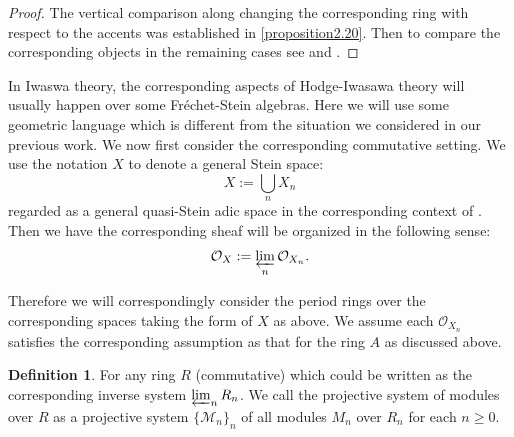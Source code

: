 \documentclass[12pt]{amsart}
\theoremstyle{definition}
\newtheorem{definition}[theorem]{Definition}
\numberwithin{equation}{section}
\begin{document}
\begin{proof}
The vertical comparison along changing the corresponding ring with respect to the accents was established in \cref{proposition2.20}. Then to compare the corresponding objects in the remaining cases see \cite[Theorem 5.7.4]{KL16} and \cite[Proposition 5.44]{XT2}.	
\end{proof}












\indent In Iwaswa theory, the corresponding aspects of Hodge-Iwasawa theory will usually happen over some Fr\'echet-Stein algebras. Here we will use some geometric language which is different from the situation we considered in our previous work. We now first consider the corresponding commutative setting. We use the notation $X$ to denote a general Stein space:
\begin{displaymath}
X:= \bigcup_{n} X_n	
\end{displaymath}
regarded as a general quasi-Stein adic space in the corresponding context of \cite[Chapter 2.6]{KL16}. Then we have the corresponding sheaf will be organized in the following sense:
\begin{align}
\mathcal{O}_X:=\varprojlim_{n} \mathcal{O}_{X_n}.	
\end{align}

Therefore we will correspondingly consider the period rings over the corresponding spaces taking the form of $X$ as above. We assume each $\mathcal{O}_{X_n}$ satisfies the corresponding assumption as that for the ring $A$ as discussed above. 

\begin{definition}
For any ring $R$ (commutative) which could be written as the corresponding inverse system $\varprojlim_n R_n$. We call the projective system of modules over $R$ as a projective system $\{\mathcal{M}_n\}_n$ of all modules $M_n$ over $R_n$ for each $n\geq 0$.	
\end{definition}
\end{document}

